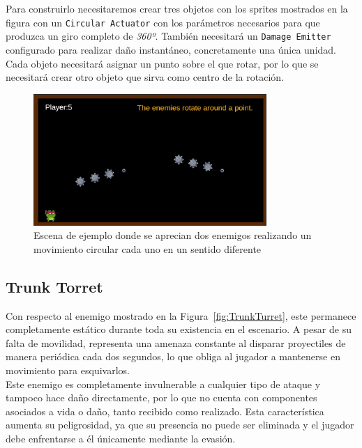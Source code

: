 Para construirlo necesitaremos crear tres objetos con los sprites mostrados en la figura con un \texttt{Circular Actuator} con los parámetros necesarios para que produzca un giro completo de \textit{360º}. También necesitará un \texttt{Damage Emitter} configurado para realizar daño instantáneo, concretamente una única unidad.\\

Cada objeto necesitará asignar un punto sobre el que rotar, por lo que se necesitará crear otro objeto que sirva como centro de la rotación.\\

\begin{figure}[t]
	\centering
	\includegraphics[height=5cm]{Imagenes/SpinningRocks.png}
	\caption{Escena de ejemplo donde se aprecian dos enemigos realizando un movimiento circular cada uno en un sentido diferente}
	\label{fig:SpinningRocks}
\end{figure}

\subsection{Trunk Torret}

Con respecto al enemigo mostrado en la Figura~\ref{fig:TrunkTurret}, este permanece completamente estático durante toda su existencia en el escenario. A pesar de su falta de movilidad, representa una amenaza constante al disparar proyectiles de manera periódica cada dos segundos, lo que obliga al jugador a mantenerse en movimiento para esquivarlos.\\

Este enemigo es completamente invulnerable  a cualquier tipo de ataque y tampoco hace daño directamente, por lo que no cuenta con componentes asociados a vida o daño, tanto recibido como realizado. Esta característica aumenta su peligrosidad, ya que su presencia no puede ser eliminada y el jugador debe enfrentarse a él únicamente mediante la evasión.\\

